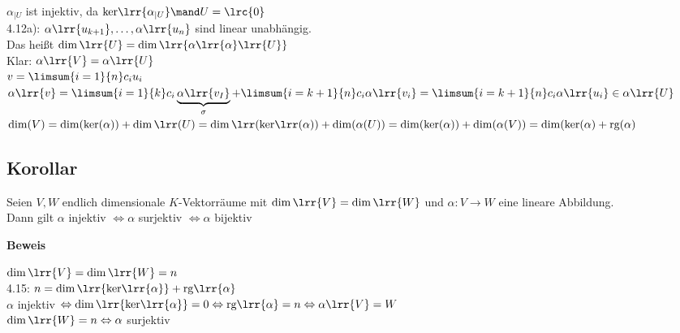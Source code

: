 	$\alpha_{\mid U}$ ist injektiv, da $\mbox{ker}\lrr{\alpha_{\mid U}}\mand U=\lrc{0}$\\
	4.12a): $\alpha\lrr{u_{k+1}},\dots,\alpha\lrr{u_n}$ sind linear unabhängig.\\
	Das heißt $\dim\lrr{U}=\dim\lrr{\alpha\lrr{\alpha}\lrr{U}}$\\
	Klar: $\alpha\lrr{V}=\alpha\lrr{U}$\\
	$v=\limsum{i=1}{n}c_iu_i$\\
	$\alpha\lrr{v}=\limsum{i=1}{k}c_i\underbrace{\alpha\lrr{v_I}}_{\scriptstyle\sigma}+\limsum{i=k+1}{n}c_i\alpha\lrr{v_i}=\limsum{i=k+1}{n}c_i\alpha\lrr{u_i}\in\alpha\lrr{U}$\\
	
	$\dim(V)=\dim(\mbox{ker}(\alpha))+\dim\lrr(U)=\dim\lrr(\mbox{ker}\lrr(\alpha))+\dim(\alpha(U))=\dim(\mbox{ker}(\alpha))+ \dim(\alpha(V))=\dim(\mbox{ker}(\alpha)+\mbox{rg}(\alpha)$
	
\subsection{Korollar}
	Seien $V,W$ endlich dimensionale $K$-Vektorräume mit $\dim\lrr{V}=\dim\lrr{W}$ und $\alpha:V\rightarrow W$ eine lineare Abbildung.\\
	Dann gilt $\alpha$ injektiv $\Leftrightarrow\alpha$ surjektiv $\Leftrightarrow\alpha$ bijektiv
	
	\textbf{Beweis}
	
	$\dim\lrr{V}=\dim\lrr{W}=n$\\
	4.15: $n=\dim\lrr{\mbox{ker}\lrr{\alpha}}+\mbox{rg}\lrr{\alpha}$\\
	$\alpha$ injektiv $\Leftrightarrow\dim\lrr{\mbox{ker}\lrr{\alpha}}=0\Leftrightarrow\mbox{rg}\lrr{\alpha}=n\Leftrightarrow\alpha\lrr{V}=W$\\
	$\dim\lrr{W}=n\Leftrightarrow\alpha$ surjektiv
	
